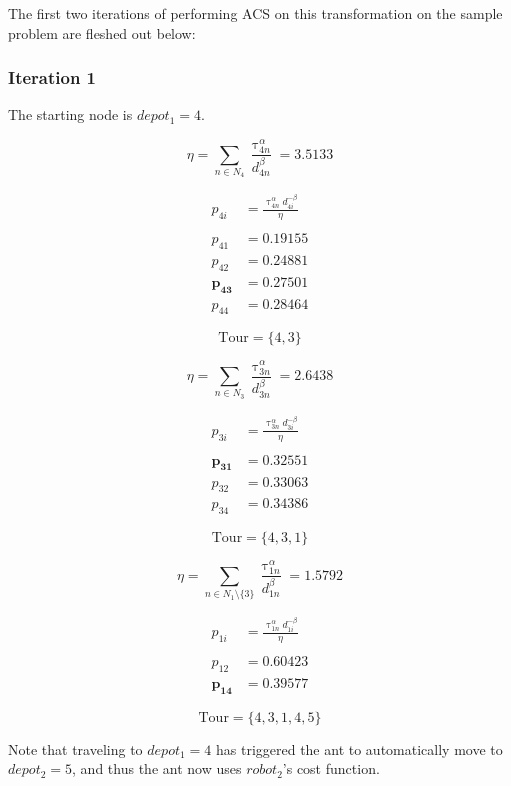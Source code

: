 \documentclass[a4paper]{article}
\begin{document}
The first two iterations of performing ACS on this transformation on the sample
problem are fleshed out below:

\subsubsection{Iteration 1}

The starting node is $depot_1 = 4$.

$$
\eta = \sum_{n \in N_4} \frac{\uptau_{4n}^\alpha}{d_{4n}^\beta} = 3.5133
$$

\begin{align*}
p_{4i} &= \frac{\uptau_{4n}^\alpha d_{4i}^{-\beta}}{\eta} \\
\\
p_{41} &= 0.19155 \\
p_{42} &= 0.24881 \\
\mathbf{p_{43}} &= \mathbf{0.27501} \\
p_{44} &= 0.28464
\end{align*}

$$
\text{Tour} = \{4, 3\}
$$


$$
\eta = \sum_{n \in N_3} \frac{\uptau_{3n}^\alpha}{d_{3n}^\beta} = 2.6438
$$

\begin{align*}
p_{3i} &= \frac{\uptau_{3n}^\alpha d_{3i}^{-\beta}}{\eta} \\
\\
\mathbf{p_{31}} &= \mathbf{0.32551} \\
p_{32} &= 0.33063 \\
p_{34} &= 0.34386
\end{align*}

$$
\text{Tour} = \{4, 3, 1\}
$$


$$
\eta = \sum_{n \in N_1\setminus\{3\}} \frac{\uptau_{1n}^\alpha}{d_{1n}^\beta} = 1.5792
$$

\begin{align*}
p_{1i} &= \frac{\uptau_{1n}^\alpha d_{1i}^{-\beta}}{\eta} \\
\\
p_{12} &= 0.60423 \\
\mathbf{p_{14}} &= \mathbf{0.39577}
\end{align*}

$$
\text{Tour} = \{4, 3, 1, 4, 5\}
$$

Note that traveling to $depot_1 = 4$ has triggered the ant to automatically move to $depot_2 = 5$, and thus the ant now uses $robot_2$'s cost function.
\end{document}

